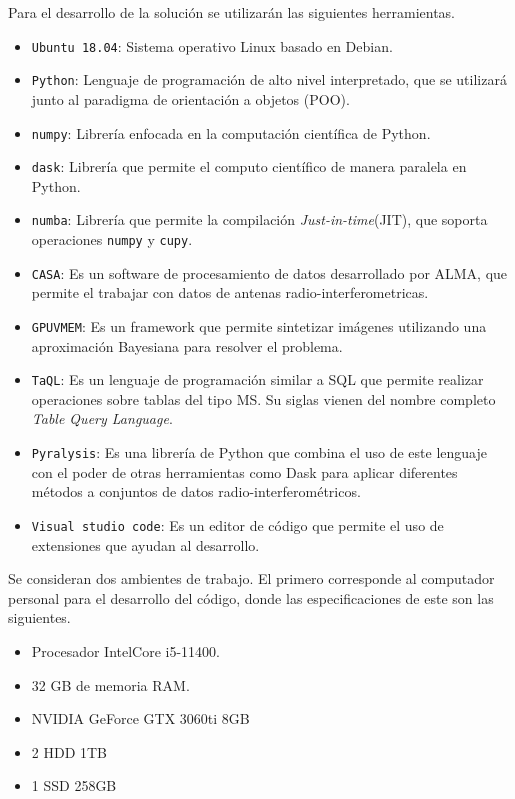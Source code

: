 Para el desarrollo de la solución se utilizarán las siguientes herramientas.

\begin{itemize}
    \item \verb|Ubuntu 18.04|: Sistema operativo Linux basado en Debian. 
    \item \verb|Python|: Lenguaje de programación de alto nivel interpretado, que se utilizará junto al paradigma de orientación a objetos (POO).
    \item \verb|numpy|: Librería enfocada en la computación científica de Python.
    \item \verb|dask|: Librería que permite el computo científico de manera paralela en Python.
    \item \verb|numba|: Librería que permite la compilación \textit{Just-in-time}(JIT), que soporta operaciones \texttt{numpy} y \texttt{cupy}.
    \item \verb|CASA|: Es un software de procesamiento de datos desarrollado por ALMA, que permite el trabajar con datos de antenas radio-interferometricas. 
    \item \verb|GPUVMEM|: Es un framework que permite sintetizar imágenes utilizando una aproximación Bayesiana para resolver el problema.
    \item \texttt{TaQL}: Es un lenguaje de programación similar a SQL que permite realizar operaciones sobre tablas del tipo MS. Su siglas vienen del nombre completo \textit{Table Query Language}.
    \item \texttt{Pyralysis}: Es una librería de Python que combina el uso de este lenguaje con el poder de otras herramientas como Dask para aplicar diferentes métodos a conjuntos de datos radio-interferométricos.  
    \item \texttt{Visual studio code}: Es un editor de código que permite el uso de extensiones que ayudan al desarrollo.
\end{itemize}


Se consideran dos ambientes de trabajo. El primero corresponde al computador personal para el desarrollo del código, donde las especificaciones de este son las siguientes. 

\begin{itemize}
    \item Procesador IntelCore i5-11400.
    \item 32 GB de memoria RAM. 
    \item NVIDIA GeForce GTX 3060ti 8GB
    \item 2 HDD 1TB
    \item 1 SSD 258GB
\end{itemize}

